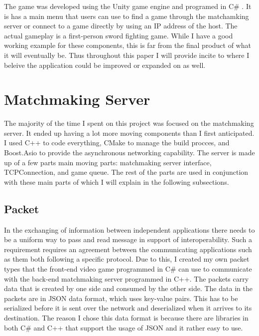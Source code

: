 \documentclass[conference]{IEEEtran}
\begin{document}
The game was developed using the Unity game engine and programed in C\# .
It is has a main menu that users can use to find a game through the matchamking server or connect to a game directly by using an IP address of the host.
The actual gameplay is a first-person sword fighting game.
While I have a good working example for these components, this is far from the final product of what it will eventually be.
Thus throughout this paper I will provide incite to where I beleive the application could be improved or expanded on as well.

\section{Matchmaking Server}
The majority of the time I spent on this project was focused on the matchmaking server.
It ended up having a lot more moving components than I first anticipated.
I used C++ to code everything, CMake to manage the build procces, and Boost.Asio to provide the asynchronous networking capability.
The server is made up of a few parts main moving parts: matchmaking server interface, TCPConnection, and game queue.
The rest of the parts are used in conjunction with these main parts of which I will explain in the following subsections.

\subsection{Packet}
In the exchanging of information between independent applications there needs to be a uniform way to pass and read message in support of interoperability. 
Such a requirement requires an agreement between the communicating applications such as them both following a specific protocol.
Due to this, I created my own packet types that the front-end video game programmed in C\# can use to communicate with the back-end matchmaking server programmed in C++.
The packets carry data that is created by one side and  consumed by the other side.
The data in the packets are in JSON data format, which uses key-value pairs.
This has to be serialized before it is sent over the network and deserialized when it arrives to its destination.
The reason I chose this data format is because there are libraries in both C\# and C++ that support the usage of JSON and it rather easy to use.
\end{document}
